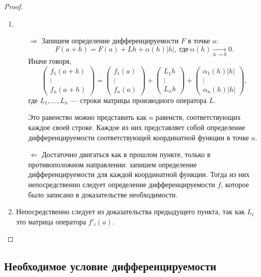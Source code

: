 \begin{proof}
	\begin{enumerate}
		\item \begin{enumerate}
			\item[\(\Rightarrow\)] Запишем определение дифференцируемости \(F\) в точке \(a\): \[
				F(a + h) = F(a) + Lh + \alpha(h) |h|, \ \text{где} \ \alpha(h) \xrightarrow[h \to 0]{} 0.
			\]
			Иначе говоря, \[
				\begin{pmatrix}
					f_1(a + h) \\
					\vdots	   \\
					f_n(a + h)
				\end{pmatrix}
				=
				\begin{pmatrix}
					f_1(a) \\
					\vdots \\
					f_n(a)
				\end{pmatrix}
				+
				\begin{pmatrix}
					L_1 h  \\
					\vdots \\
					L_n h
				\end{pmatrix}
				+
				\begin{pmatrix}
					\alpha_1(h) |h| \\
					\vdots			\\
					\alpha_n(h) |h|
				\end{pmatrix},
			\]
			где \(L_1, \ldots, L_n\) --- строки матрицы производного оператора \(L\).

			Это равенство можно представить как \(n\) равенств, соответствующих каждое своей строке. Каждое из них представляет собой определение дифференцируемости соответствующей координатной функции в точке \(a\).
			\item[\(\Leftarrow\)] Достаточно двигаться как в прошлом пункте, только в противоположном направлении: запишем определение дифференцируемости для каждой координатной функции. Тогда из них непосредственно следует определение дифференцируемости \(f\), которое было записано в доказательстве необходимости.
		\end{enumerate}
		\item Непосредственно следует из доказательства предыдущего пункта, так как \(L_i\) это матрица оператора \(f'_i(a)\).
	\end{enumerate}
\end{proof}

\subsection{Необходимое условие дифференцируемости}

